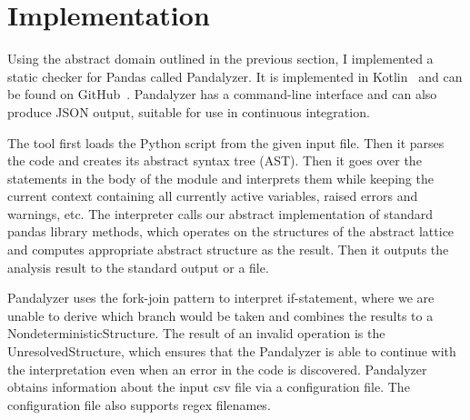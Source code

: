 \section{Implementation}

Using the abstract domain outlined in the previous section, I implemented a static checker for Pandas called Pandalyzer.
It is implemented in Kotlin~\cite{kotlinDocs} and can be found on GitHub~\cite{pandalyzer}.
Pandalyzer has a command-line interface and can also produce JSON output, suitable for use in continuous integration.

The tool first loads the Python script from the given input file.
Then it parses the code and creates its abstract syntax tree (AST).
Then it goes over the statements in the body of the module and interprets them while keeping the current context
containing all currently active variables, raised errors and warnings, etc.
The interpreter calls our abstract implementation of standard pandas library methods, which operates on the structures
of the abstract lattice and computes appropriate abstract structure as the result.
Then it outputs the analysis result to the standard output or a file.

Pandalyzer uses the fork-join pattern to interpret if-statement, where we are unable to derive which
branch would be taken and combines the results to a NondeterministicStructure.
The result of an invalid operation is the UnresolvedStructure, which ensures that the Pandalyzer is able to continue
with the interpretation even when an error in the code is discovered.
Pandalyzer obtains information about the input csv file via a configuration file.
The configuration file also supports regex filenames.